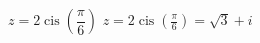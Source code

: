 { $z = 2\operatorname{cis}\left(\dfrac{\pi}{6}\right)$ }
{ $z = 2\operatorname{cis}\left(\frac{\pi}{6}\right) = \sqrt{3} + i$}
